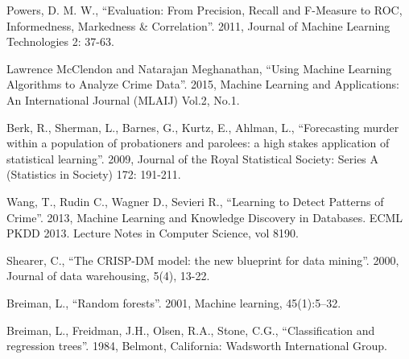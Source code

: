 \begin{thebibliography}{10}

 Powers, D. M. W., “Evaluation: From Precision, Recall and F-Measure to ROC, Informedness, Markedness \& Correlation”. 2011, Journal of Machine Learning Technologies 2: 37-63.

 Lawrence McClendon and Natarajan Meghanathan, “Using Machine Learning Algorithms to Analyze Crime Data”. 2015, Machine Learning and Applications: An International Journal (MLAIJ) Vol.2, No.1.

 Berk,  R.,  Sherman,  L.,  Barnes,  G.,  Kurtz,  E.,  Ahlman,  L., “Forecasting  murder within  a  population  of  probationers  and parolees: a high stakes application of statistical learning”. 2009, Journal of the Royal Statistical Society: Series A (Statistics in Society) 172: 191-211.

 Wang, T., Rudin C., Wagner D., Sevieri R., “Learning to Detect Patterns of Crime”. 2013, Machine Learning and Knowledge Discovery in Databases. ECML PKDD 2013. Lecture Notes in Computer Science, vol 8190.

 Shearer, C., “The CRISP-DM model: the new blueprint for data mining”. 2000, Journal of data warehousing, 5(4), 13-22.

 Breiman, L., “Random forests”. 2001, Machine learning, 45(1):5–32.

 Breiman, L., Freidman, J.H., Olsen, R.A., Stone, C.G., “Classification and regression trees”. 1984, Belmont, California: Wadsworth International Group.

\end{thebibliography}